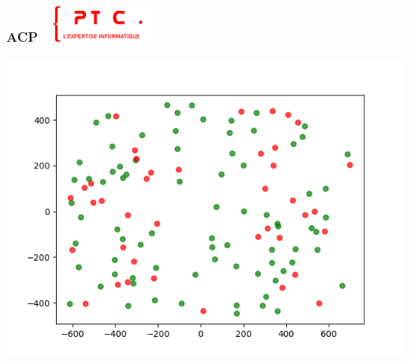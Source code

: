 \documentclass[11pt]{beamer}
\newenvironment{slide}[1]{%
\begin{frame}[environment=slide]
\frametitle{#1~\hfill~\includegraphics[height=1.2cm]{./epitech.png}}
}{%
\end{frame}
}
\begin{document}
\begin{slide}{ACP}
\begin{center}
\includegraphics[scale=0.4]{titanic_acp_mv}
\end{center}
\end{slide}
\end{document}
